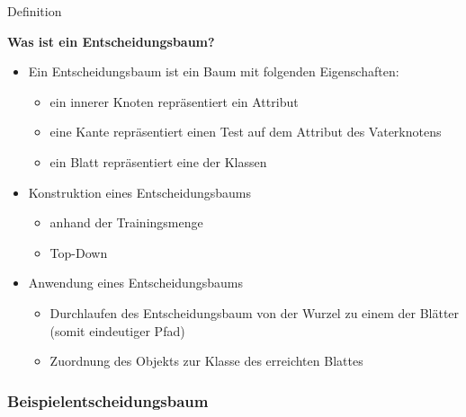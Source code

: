 \begin{frame}{Definition}
\subtitle{uuuuu}
\textbf{Was ist ein Entscheidungsbaum?} \\[2em]
\begin{Definition}

\begin{itemize}[<+->]
    \item Ein Entscheidungsbaum ist ein Baum mit folgenden Eigenschaften:
    \begin{itemize}[<+->]
        \item ein innerer Knoten repräsentiert ein \textcolor{ohmred}{Attribut}
        \item eine Kante repräsentiert einen Test auf dem Attribut des Vaterknotens
        \item ein Blatt repräsentiert eine der \textcolor{ohmgreen}{Klassen}
    \end{itemize}
    \item  Konstruktion eines Entscheidungsbaums
        \begin{itemize}[<+->]
            \item anhand der Trainingsmenge
            \item Top-Down
        \end{itemize}
    \item Anwendung eines Entscheidungsbaums
    \begin{itemize}[<+->]
        \item Durchlaufen des Entscheidungsbaum von der Wurzel zu einem der Blätter (somit eindeutiger Pfad)
        \item Zuordnung des Objekts zur Klasse des erreichten Blattes
    \end{itemize}
\end{itemize}

\end{Definition}

\end{frame}


\subsubsection{Beispielentscheidungsbaum}

